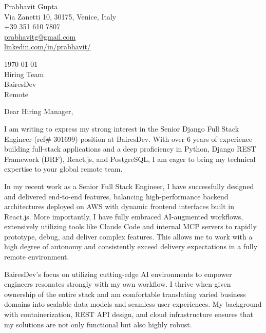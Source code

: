 \documentclass[11pt,a4paper]{article}
\begin{document}
\begin{flushleft}
Prabhavit Gupta \\
Via Zanetti 10, 30175, Venice, Italy \\
+39 351 610 7807 \\
\href{mailto:prabhavitg@gmail.com}{prabhavitg@gmail.com} \\
\href{https://www.linkedin.com/in/prabhavit/}{linkedin.com/in/prabhavit/}
\end{flushleft}

\vspace{5mm}

\begin{flushleft}
\today \\
\vspace{5mm}
Hiring Team \\
BairesDev \\
Remote
\end{flushleft}

\vspace{5mm}

\noindent Dear Hiring Manager,

\vspace{3mm}

\noindent I am writing to express my strong interest in the Senior Django Full Stack Engineer (ref\# 301699) position at BairesDev. With over 6 years of experience building full-stack applications and a deep proficiency in Python, Django REST Framework (DRF), React.js, and PostgreSQL, I am eager to bring my technical expertise to your global remote team.

\vspace{3mm}

\noindent In my recent work as a Senior Full Stack Engineer, I have successfully designed and delivered end-to-end features, balancing high-performance backend architectures deployed on AWS with dynamic frontend interfaces built in React.js. More importantly, I have fully embraced AI-augmented workflows, extensively utilizing tools like Claude Code and internal MCP servers to rapidly prototype, debug, and deliver complex features. This allows me to work with a high degree of autonomy and consistently exceed delivery expectations in a fully remote environment.

\vspace{3mm}

\noindent BairesDev's focus on utilizing cutting-edge AI environments to empower engineers resonates strongly with my own workflow. I thrive when given ownership of the entire stack and am comfortable translating varied business domains into scalable data models and seamless user experiences. My background with containerization, REST API design, and cloud infrastructure ensures that my solutions are not only functional but also highly robust.
\end{document}
